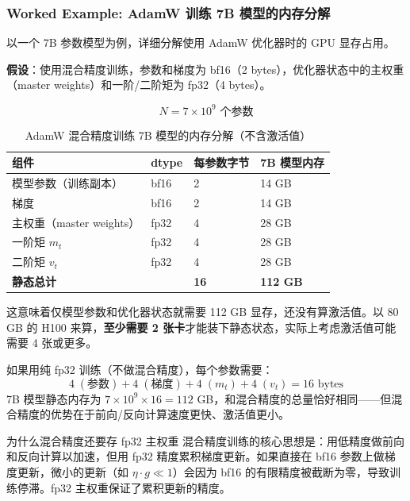\documentclass[a4paper]{article}
\begin{document}
\subsubsection{Worked Example: AdamW 训练 7B 模型的内存分解}

以一个 7B 参数模型为例，详细分解使用 AdamW 优化器时的 GPU 显存占用。

\textbf{假设}：使用混合精度训练，参数和梯度为 bf16（2 bytes），优化器状态中的主权重（master weights）和一阶/二阶矩为 fp32（4 bytes）。

$$
N = 7 \times 10^9 \text{ 个参数}
$$

\begin{table}[H]
\centering
\begin{tabular}{p{}p{}p{}p{}}
\toprule
\textbf{组件} & \textbf{dtype} & \textbf{每参数字节} & \textbf{7B 模型内存} \\
\midrule
模型参数（训练副本） & bf16 & 2 & 14 GB \\
梯度 & bf16 & 2 & 14 GB \\
主权重（master weights） & fp32 & 4 & 28 GB \\
一阶矩 $m_t$ & fp32 & 4 & 28 GB \\
二阶矩 $v_t$ & fp32 & 4 & 28 GB \\
\midrule
\textbf{静态总计} & & \textbf{16} & \textbf{112 GB} \\
\bottomrule
\end{tabular}
\caption{AdamW 混合精度训练 7B 模型的内存分解（不含激活值）}
\end{table}

这意味着仅模型参数和优化器状态就需要 112 GB 显存，还没有算激活值。以 80 GB 的 H100 来算，\textbf{至少需要 2 张卡}才能装下静态状态，实际上考虑激活值可能需要 4 张或更多。

如果用纯 fp32 训练（不做混合精度），每个参数需要：
$$
4\;(\text{参数}) + 4\;(\text{梯度}) + 4\;(m_t) + 4\;(v_t) = 16 \text{ bytes}
$$
7B 模型静态内存为 $7 \times 10^9 \times 16 = 112$ GB，和混合精度的总量恰好相同——但混合精度的优势在于前向/反向计算速度更快、激活值更小。

\begin{knowledgebox}{为什么混合精度还要存 fp32 主权重}
混合精度训练的核心思想是：用低精度做前向和反向计算以加速，但用 fp32 精度累积梯度更新。如果直接在 bf16 参数上做梯度更新，微小的更新（如 $\eta \cdot g \ll 1$）会因为 bf16 的有限精度被截断为零，导致训练停滞。fp32 主权重保证了累积更新的精度。
\end{knowledgebox}
\end{document}
